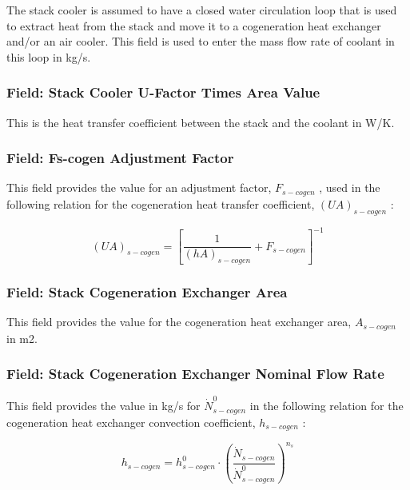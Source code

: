 The stack cooler is assumed to have a closed water circulation loop that is used to extract heat from the stack and move it to a cogeneration heat exchanger and/or an air cooler. This field is used to enter the mass flow rate of coolant in this loop in kg/s.

\subsubsection{Field: Stack Cooler U-Factor Times Area Value}\label{field-stack-cooler-u-factor-times-area-value}

This is the heat transfer coefficient between the stack and the coolant in W/K.

\subsubsection{Field: Fs-cogen Adjustment Factor}\label{field-fs-cogen-adjustment-factor}

This field provides the value for an adjustment factor, \({F_{s - cogen}}\) , used in the following relation for the cogeneration heat transfer coefficient, \({\left( {UA} \right)_{s - cogen}}\) :

\begin{equation}
{\left( {UA} \right)_{s - cogen}} = {\left[ {\frac{1}{{{{\left( {hA} \right)}_{s - cogen}}}} + {F_{s - cogen}}} \right]^{ - 1}}
\end{equation}

\subsubsection{Field: Stack Cogeneration Exchanger Area}\label{field-stack-cogeneration-exchanger-area}

This field provides the value for the cogeneration heat exchanger area, \({A_{s - cogen}}\) in m2.

\subsubsection{Field: Stack Cogeneration Exchanger Nominal Flow Rate}\label{field-stack-cogeneration-exchanger-nominal-flow-rate}

This field provides the value in kg/s for \(\dot N_{s - cogen}^0\) in the following relation for the cogeneration heat exchanger convection coefficient, \({h_{s - cogen}}\) :

\begin{equation}
{h_{s - cogen}} = h_{s - cogen}^0 \cdot {\left( {\frac{{{{\dot N}_{s - cogen}}}}{{\dot N_{s - cogen}^0}}} \right)^{{n_s}}}
\end{equation}

